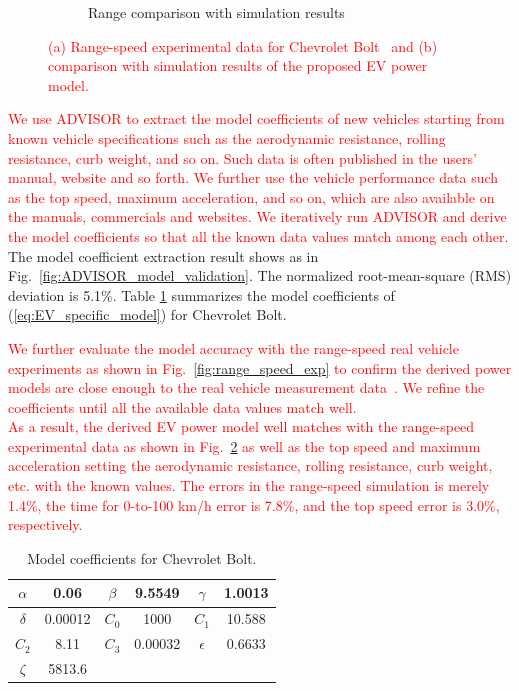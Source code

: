 \documentclass{IEEEtran}
\begin{document}
\begin{figure}
\begin{subfigure}{0.4\textwidth}
	\caption{Range comparison with simulation results}
	\label{fig:range_speed_valid}
	\end{subfigure}
\caption{\textcolor{red}{(a) Range-speed experimental data for Chevrolet Bolt~\cite{GM_Bolt:range_speed} and (b) comparison with simulation results of the proposed EV power model.}}
\end{figure}

\textcolor{red}{We use ADVISOR to extract the model coefficients of new vehicles starting from known vehicle specifications such as the aerodynamic resistance, rolling resistance, curb weight, and so on. Such data is often published in the users' manual, website and so forth. We further use the vehicle performance data such as the top speed, maximum acceleration, and so on, which are also available on the manuals, commercials and websites. We iteratively run ADVISOR and derive the model coefficients so that all the known data values match among each other.}
The model coefficient extraction result shows as in Fig.~\ref{fig:ADVISOR_model_validation}. The normalized root-mean-square (RMS) deviation is 5.1\%. Table \ref{table:Coeff_Bolt} summarizes the model coefficients of (\ref{eq:EV_specific_model}) for Chevrolet Bolt. 

\textcolor{red}{We further evaluate the model accuracy with the range-speed real vehicle experiments as shown in Fig.~\ref{fig:range_speed_exp} to confirm the derived power models are close enough to the real vehicle measurement data~\cite{GM_Bolt:range25mph,GM_Bolt:range65mph,GM_Bolt:range75mph,GM_Bolt:range93mph,GM_Bolt:range_speed}. We  refine the coefficients until all the available data values match well. \\
As a result, the derived EV power model well matches with the range-speed experimental data as shown in Fig.~\ref{fig:range_speed_valid} as well as the top speed and maximum acceleration setting the aerodynamic resistance, rolling resistance, curb weight, etc. with the known values. The errors in the range-speed simulation is merely 1.4\%, the time for 0-to-100 km/h error is 7.8\%, and the top speed error is 3.0\%, respectively.} 

\begin{table}
\caption{Model coefficients for Chevrolet Bolt.}
\label{table:Coeff_Bolt}
\centering
\begin{tabular}{|c|c|c|c|c|c|}  \hline
$\alpha$	&0.06		&$\beta$	&9.5549	&$\gamma$	&1.0013	\\ \hline
$\delta$	&0.00012 		&$C_0$	&1000 	&$C_1$		&10.588	\\ \hline
$C_2$	&8.11		&$C_3$	&0.00032	&$\epsilon$	&0.6633	\\ \hline
$\zeta$	&5813.6		\\ \cline{1-2}
\end{tabular}
\end{table}
\end{document}
